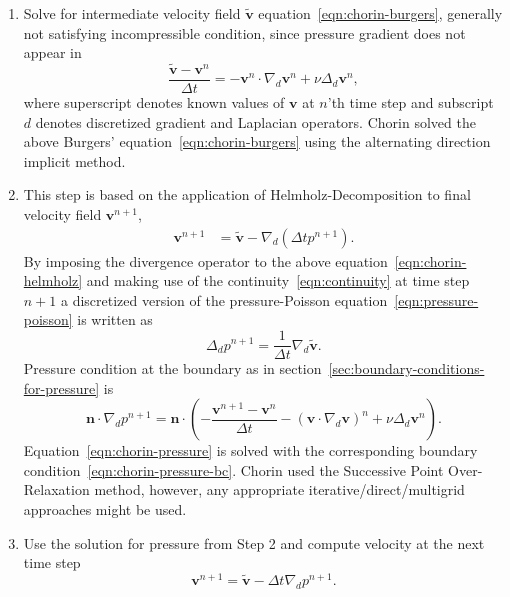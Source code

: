 \documentclass{article}
\begin{document}
\begin{enumerate}
	\item Solve for intermediate velocity field $\boldsymbol{\tilde v}$ equation~\eqref{eqn:chorin-burgers}, generally not satisfying incompressible condition, since pressure gradient does not appear in
		\begin{equation}\label{eqn:chorin-burgers}
			\frac{\boldsymbol{\tilde v} - \boldsymbol{v}^n}{\Delta t}=-\boldsymbol{v}^n\cdot\nabla_d\boldsymbol{v}^n+\nu \Delta_d\boldsymbol{v}^n,
		\end{equation}
		where superscript denotes known values of $\boldsymbol{v}$ at $n$'th time step and subscript $d$ denotes discretized gradient and Laplacian operators.
		Chorin solved the above Burgers' equation~\eqref{eqn:chorin-burgers} using the alternating direction implicit method. 
	\item This step is based on the application of Helmholz-Decomposition to final velocity field $\boldsymbol{v}^{n+1}$,
		\begin{equation}\label{eqn:chorin-helmholz}
		\begin{aligned}
			\boldsymbol{v}^{n+1}&=\boldsymbol{\tilde v}-\nabla_d (\Delta tp^{n+1}).
		\end{aligned}
		\end{equation}
		By imposing the divergence operator to the above equation~\eqref{eqn:chorin-helmholz} and making use of the continuity~\eqref{eqn:continuity} at time step $n+1$ a discretized version of the pressure-Poisson equation~\eqref{eqn:pressure-poisson} is written as
		\begin{equation}\label{eqn:chorin-pressure}
			\Delta_d p^{n+1}=\frac{1}{\Delta t}\nabla_d\boldsymbol{\tilde v}.
		\end{equation}
		Pressure condition at the boundary as in section~\ref{sec:boundary-conditions-for-pressure} is
		\begin{equation}\label{eqn:chorin-pressure-bc}
			\boldsymbol{n} \cdot \nabla_d p^{n+1}=\boldsymbol{n} \cdot\left(-\frac{\boldsymbol{v}^{n+1}-\boldsymbol{v}^n}{\Delta t}-\left(\boldsymbol{v} \cdot \nabla_d \boldsymbol{v}\right)^n+\nu \Delta_d \boldsymbol{v}^n\right).
		\end{equation}
		Equation~\eqref{eqn:chorin-pressure} is solved with the corresponding boundary condition~\eqref{eqn:chorin-pressure-bc}. Chorin used the Successive Point Over-Relaxation method, however, any appropriate iterative/direct/multigrid approaches might be used.
	\item Use the solution for pressure from Step 2 and compute velocity at the next time step
		\begin{equation}\label{eqn:chorin-corrector}
			\boldsymbol{v}^{n+1}=\tilde{\boldsymbol{v}}-\Delta t \nabla_d p^{n+1}.
		\end{equation}
\end{enumerate}
\end{document}
